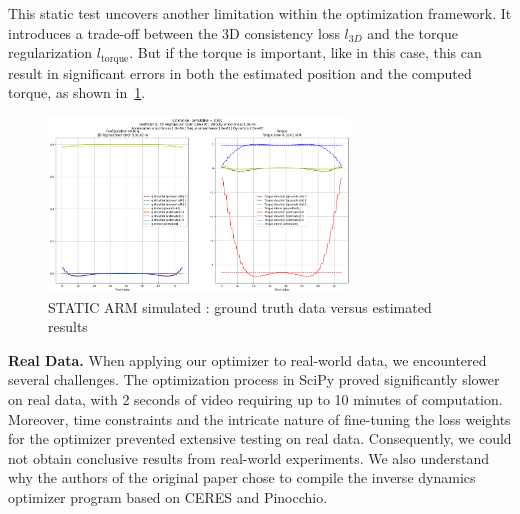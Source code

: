 This static test uncovers another limitation within the optimization framework. It introduces a 
trade-off between the 3D consistency loss \(l_{3D}\) and the torque regularization 
\(l_{\text{torque}}\). But if the torque is important, like in this case, this can result in 
significant errors in both the estimated 
position and the computed torque, as shown in~\cref{fig:static}.

\begin{figure}
    \centering
    \includegraphics[width=8cm]{figures/inverse_dynamics_static_case.png}
    \caption{STATIC ARM simulated : ground truth data versus estimated results}
    \label{fig:static}
\end{figure}



\noindent\textbf{Real Data.} When applying our optimizer to real-world data, we encountered several challenges. 
The optimization process in SciPy proved significantly slower on real data, with 2 seconds of video requiring up to 10 minutes of 
computation. Moreover, time constraints and the intricate nature of fine-tuning the loss weights for the optimizer prevented extensive 
testing on real data. Consequently, we could not obtain conclusive results from real-world experiments. We also understand
why the authors of the original paper chose to compile the inverse dynamics optimizer program based on CERES and Pinocchio.